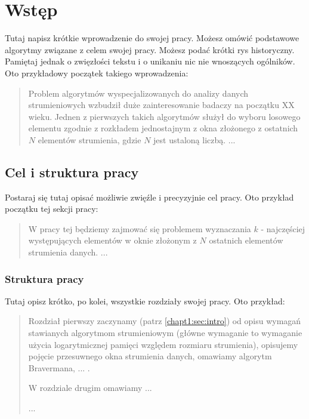 \chapter{Wstęp}
\label{chapt:Wstep}

Tutaj napisz krótkie wprowadzenie do swojej pracy. Możesz omówić podstawowe algorytmy związane z celem swojej pracy. Możesz podać krótki rys historyczny. Pamiętaj jednak o zwięzłości tekstu i o unikaniu nic nie wnoszących ogólników.   
Oto przykładowy początek takiego wprowadzenia:

\begin{quote}
Problem algorytmów wyspecjalizowanych do analizy danych strumieniowych wzbudził duże zainteresowanie badaczy na początku XX wieku. Jednen z pierwszych takich algorytmów służył do wyboru losowego elementu zgodnie z rozkładem jednostajnym  z okna złożonego z ostatnich $N$ elementów strumienia, gdzie $N$ jest ustaloną liczbą.  ...
\end{quote}

      
\section{Cel i struktura pracy}
                                       
Postaraj się tutaj opisać możliwie zwięźle i precyzyjnie cel pracy. Oto przykład początku tej sekcji pracy:

\begin{quote}
W pracy tej będziemy zajmować się problemem wyznaczania $k$ - najczęściej występujących elementów w oknie złożonym z $N$ ostatnich elementów strumienia danych. ... 
\end{quote}

\subsection*{Struktura pracy}

Tutaj opisz krótko, po kolei, wszystkie rozdziały swojej pracy. Oto przykład:

\begin{quote}
Rozdział pierwszy zaczynamy (patrz \ref{chapt1:sec:intro}) od opisu wymagań stawianych algorytmom strumieniowym (główne wymaganie to wymaganie użycia logarytmicznej pamięci względem rozmiaru strumienia), opisujemy pojęcie przesuwnego okna strumienia danych, omawiamy algorytm Bravermana,  ... .\par

W rozdziale drugim omawiamy ... \par
...
\end{quote}

